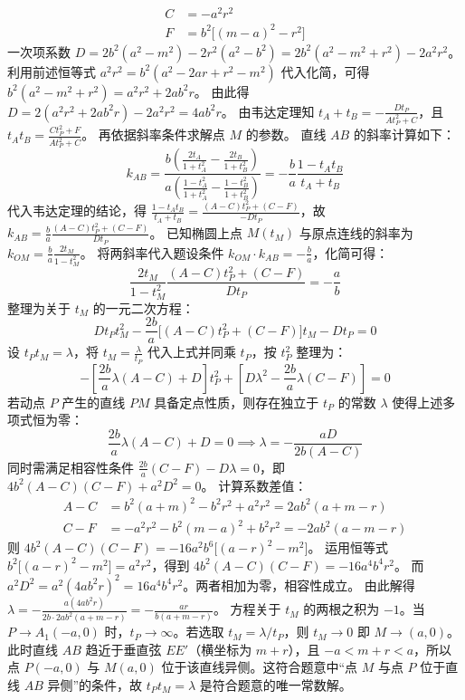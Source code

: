 \begin{solution}
\begin{align*}
C &= -a^2 r^2 \\
F &= b^2 \big[ (m-a)^2 - r^2 \big]
\end{align*}
一次项系数 $D = 2b^2(a^2 - m^2) - 2r^2(a^2 - b^2) = 2b^2(a^2 - m^2 + r^2) - 2a^2 r^2$。
利用前述恒等式 $a^2 r^2 = b^2(a^2 - 2ar + r^2 - m^2)$ 代入化简，可得 $b^2(a^2 - m^2 + r^2) = a^2 r^2 + 2ab^2 r$。
由此得 $D = 2(a^2 r^2 + 2ab^2 r) - 2a^2 r^2 = 4ab^2 r$。
由韦达定理知 $t_A + t_B = -\frac{D t_P}{A t_P^2 + C}$，且 $t_A t_B = \frac{C t_P^2 + F}{A t_P^2 + C}$。
再依据斜率条件求解点 $M$ 的参数。
直线 $AB$ 的斜率计算如下：
\[ k_{AB} = \frac{b\left(\frac{2t_A}{1+t_A^2} - \frac{2t_B}{1+t_B^2}\right)}{a\left(\frac{1-t_A^2}{1+t_A^2} - \frac{1-t_B^2}{1+t_B^2}\right)} = -\frac{b}{a} \frac{1-t_A t_B}{t_A+t_B} \]
代入韦达定理的结论，得 $\frac{1-t_A t_B}{t_A+t_B} = \frac{(A-C)t_P^2 + (C-F)}{-D t_P}$，故 $k_{AB} = \frac{b}{a} \frac{(A-C)t_P^2 + (C-F)}{D t_P}$。
已知椭圆上点 $M(t_M)$ 与原点连线的斜率为 $k_{OM} = \frac{b}{a} \frac{2t_M}{1-t_M^2}$。
将两斜率代入题设条件 $k_{OM} \cdot k_{AB} = -\frac{b}{a}$，化简可得：
\[ \frac{2t_M}{1-t_M^2} \frac{(A-C)t_P^2 + (C-F)}{D t_P} = -\frac{a}{b} \]
整理为关于 $t_M$ 的一元二次方程：
\[ D t_P t_M^2 - \frac{2b}{a} \big[ (A-C)t_P^2 + (C-F) \big] t_M - D t_P = 0 \]
设 $t_P t_M = \lambda$，将 $t_M = \frac{\lambda}{t_P}$ 代入上式并同乘 $t_P$，按 $t_P^2$ 整理为：
\[ - \left[ \frac{2b}{a} \lambda (A-C) + D \right] t_P^2 + \left[ D \lambda^2 - \frac{2b}{a} \lambda (C-F) \right] = 0 \]
若动点 $P$ 产生的直线 $PM$ 具备定点性质，则存在独立于 $t_P$ 的常数 $\lambda$ 使得上述多项式恒为零：
\[ \frac{2b}{a} \lambda (A-C) + D = 0 \implies \lambda = -\frac{aD}{2b(A-C)} \]
同时需满足相容性条件 $\frac{2b}{a}(C-F) - D\lambda = 0$，即 $4b^2(A-C)(C-F) + a^2 D^2 = 0$。
计算系数差值：
\begin{align*}
A-C &= b^2(a+m)^2 - b^2 r^2 + a^2 r^2 = 2ab^2(a+m-r) \\
C-F &= -a^2 r^2 - b^2(m-a)^2 + b^2 r^2 = -2ab^2(a-m-r)
\end{align*}
则 $4b^2(A-C)(C-F) = -16a^2 b^6 \big[ (a-r)^2 - m^2 \big]$。
运用恒等式 $b^2\big[ (a-r)^2 - m^2 \big] = a^2 r^2$，得到 $4b^2(A-C)(C-F) = -16a^4 b^4 r^2$。
而 $a^2 D^2 = a^2(4ab^2 r)^2 = 16a^4 b^4 r^2$。两者相加为零，相容性成立。
由此解得 $\lambda = -\frac{a(4ab^2 r)}{2b \cdot 2ab^2(a+m-r)} = -\frac{ar}{b(a+m-r)}$。
方程关于 $t_M$ 的两根之积为 $-1$。当 $P \to A_1(-a,0)$ 时，$t_P \to \infty$。若选取 $t_M = \lambda / t_P$，则 $t_M \to 0$ 即 $M \to (a,0)$。此时直线 $AB$ 趋近于垂直弦 $EE'$（横坐标为 $m+r$），且 $-a < m+r < a$，所以点 $P(-a,0)$ 与 $M(a,0)$ 位于该直线异侧。这符合题意中“点 $M$ 与点 $P$ 位于直线 $AB$ 异侧”的条件，故 $t_P t_M = \lambda$ 是符合题意的唯一常数解。

\end{solution}
